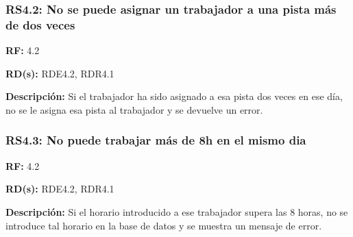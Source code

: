 \subsubsection{RS4.2: No se puede asignar un trabajador a una pista más de dos veces}
\textbf{RF:} 4.2

\textbf{RD(s):} RDE4.2, RDR4.1

\textbf{Descripción:} Si el trabajador ha sido asignado a esa pista dos veces en ese día, no se le asigna esa pista al trabajador y se devuelve un error.

\subsubsection{RS4.3: No puede trabajar más de 8h en el mismo dia}
\textbf{RF:} 4.2

\textbf{RD(s):} RDE4.2, RDR4.1

\textbf{Descripción:} Si el horario introducido a ese trabajador supera las 8 horas, no se introduce tal horario en la base de datos y se muestra un mensaje de error.
\pagebreak
